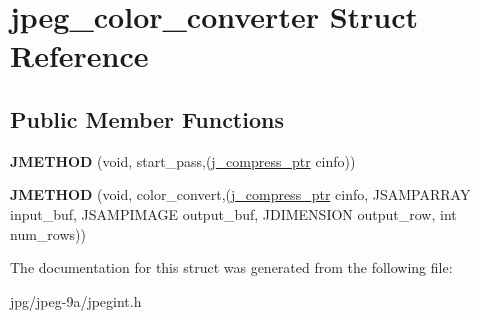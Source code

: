 \hypertarget{structjpeg__color__converter}{\section{jpeg\+\_\+color\+\_\+converter Struct Reference}
\label{structjpeg__color__converter}
}
\subsection*{Public Member Functions}
\begin{DoxyCompactItemize}
\item 
\hypertarget{structjpeg__color__converter_a1c9f24e568c3d4f67cb2021066825997}{{\bfseries J\+M\+E\+T\+H\+O\+D} (void, start\+\_\+pass,(\hyperlink{structjpeg__compress__struct}{j\+\_\+compress\+\_\+ptr} cinfo))}\label{structjpeg__color__converter_a1c9f24e568c3d4f67cb2021066825997}

\item 
\hypertarget{structjpeg__color__converter_aed90a059ad823add4785973694ed5eb9}{{\bfseries J\+M\+E\+T\+H\+O\+D} (void, color\+\_\+convert,(\hyperlink{structjpeg__compress__struct}{j\+\_\+compress\+\_\+ptr} cinfo, J\+S\+A\+M\+P\+A\+R\+R\+A\+Y input\+\_\+buf, J\+S\+A\+M\+P\+I\+M\+A\+G\+E output\+\_\+buf, J\+D\+I\+M\+E\+N\+S\+I\+O\+N output\+\_\+row, int num\+\_\+rows))}\label{structjpeg__color__converter_aed90a059ad823add4785973694ed5eb9}

\end{DoxyCompactItemize}


The documentation for this struct was generated from the following file\+:\begin{DoxyCompactItemize}
\item 
jpg/jpeg-\/9a/jpegint.\+h\end{DoxyCompactItemize}
